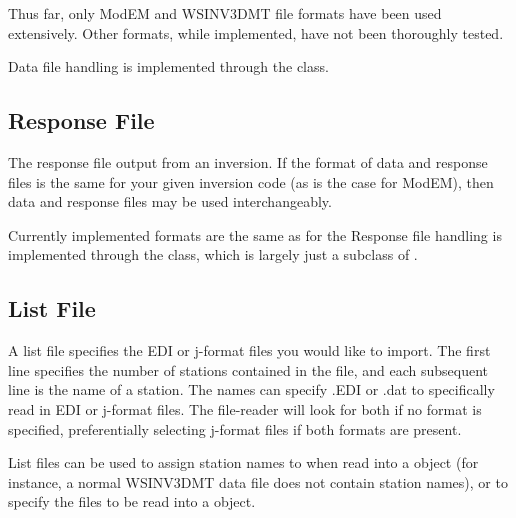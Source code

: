 \documentclass[letterpaper,10pt,english]{sphinxmanual}
\begin{document}
Thus far, only ModEM and WSINV3DMT file formats have been used extensively. Other formats, while implemented, have not been thoroughly tested.

Data file handling is implemented through the {\hyperref[\detokenize{content/api_core/data_structures:data}]{}} class.


\subsection{Response File}
\label{\detokenize{content/api_core/input_files:response-file}}\label{\detokenize{content/api_core/input_files:id3}}
The response file output from an inversion. If the format of data and response files is the same for your given inversion code (as is the case for ModEM), then data and response files may be used interchangeably.

Currently implemented formats are the same as for the {\hyperref[\detokenize{content/api_core/input_files:data-file}]{}}
Response file handling is implemented through the {\hyperref[\detokenize{content/api_core/data_structures:response}]{}} class, which is largely just a subclass of {\hyperref[\detokenize{content/api_core/data_structures:data}]{}}.


\subsection{List File}
\label{\detokenize{content/api_core/input_files:list-file}}\label{\detokenize{content/api_core/input_files:id4}}
A list file specifies the EDI or j-format files you would like to import.
The first line specifies the number of stations contained in the file, and each subsequent line is the name of a station. The names can specify .EDI or .dat to specifically read in EDI or j-format files. The file-reader will look for both if no format is specified, preferentially selecting j-format files if both formats are present.

List files can be used to assign station names to when read into a {\hyperref[\detokenize{content/api_core/data_structures:data}]{}} object (for instance, a normal WSINV3DMT data file does not contain station names), or to specify the files to be read into a {\hyperref[\detokenize{content/api_core/data_structures:rawdata}]{}} object.
\end{document}
